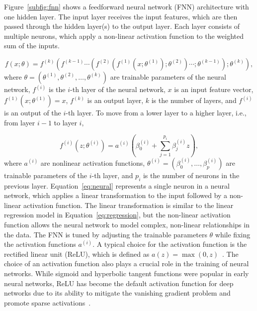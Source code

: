 Figure~\ref{subfig:fnn} shows a feedforward neural network (FNN) architecture with one hidden layer.
The input layer receives the input features, which are then passed through the hidden layer(s) to the output layer.
Each layer consists of multiple neurons, which apply a non-linear activation function to the weighted sum of the inputs.

\begin{equation}
    f(x; \theta) = f^{(k)}(f^{(k-1)} \cdots (f^{(2)}(f^{(1)}(x;\theta^{(1)});\theta^{(2)} )\cdots ;\theta^{(k-1)});\theta^{(k)}),
\end{equation}
where $\theta = (\theta^{(1)}, \theta^{(2)}, \ldots, \theta^{(k)})$ are trainable parameters of the neural network, $f^{(i)}$ is the $i$-th layer of the neural network, $x$ is an input feature vector, $f^{(1)}(x;\theta^{(1)}) = x$, $f^{(k)}$ is an output layer, $k$ is the number of layers, and $f^{(i)}$ is an output of the $i$-th layer.
To move from a lower layer to a higher layer, i.e., from layer $i-1$ to layer $i$,

\begin{equation} \label{eq:neural}
    f^{(i)}(z;\theta^{(i)}) = a^{(i)}(\beta_0^{(i)} + \sum_{j=1}^{p_i} \beta_j^{(i)} z),
\end{equation}
where $a^{(i)}$ are nonlinear activation functions, $\theta^{(i)} = (\beta_0^{(i)}, \dots, \beta_p^{(i)})$ are trainable parameters of the $i$-th layer, and $p_i$ is the number of neurons in the previous layer.
Equation~\ref{eq:neural} represents a single neuron in a neural network, which applies a linear transformation to the input followed by a non-linear activation function. 
The linear transformation is similar to the linear regression model in Equation~\ref{eq:regression}, but the non-linear activation function allows the neural network to model complex, non-linear relationships in the data.
The FNN is tuned by adjusting the trainable parameters $\theta$ while fixing the activation functions $a^{(i)}$.
A typical choice for the activation function is the rectified linear unit (ReLU), which is defined as $a(z) = \max(0, z)$~\citep{nair2010rectified}.
The choice of an activation function also plays a crucial role in the training of neural networks.
While sigmoid and hyperbolic tangent functions were popular in early neural networks, ReLU has become the default activation function for deep networks due to its ability to mitigate the vanishing gradient problem and promote sparse activations~\citep{lecun2015deep}.

